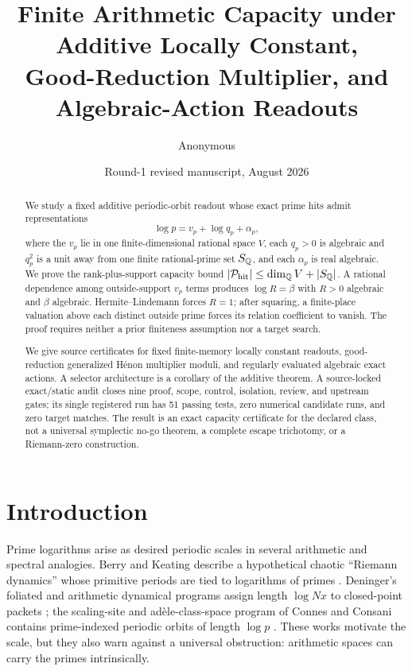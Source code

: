 \documentclass[11pt]{article}
\title{\textbf{Finite Arithmetic Capacity under Additive Locally Constant,\\
Good-Reduction Multiplier, and Algebraic-Action Readouts}}
\author{Anonymous}
\date{Round-1 revised manuscript, August 2026}
\theoremstyle{definition}
\theoremstyle{remark}
\begin{document}
\maketitle

\begin{abstract}
We study a fixed additive periodic-orbit readout whose exact prime hits admit
representations
\[
 \log p=v_p+\log q_p+\alpha_p,
\]
where the $v_p$ lie in one finite-dimensional rational space $V$, each
$q_p>0$ is algebraic and $q_p^2$ is a unit away from one finite rational-prime
set $S_{\mathbb Q}$, and each $\alpha_p$ is real algebraic.  We prove the rank-plus-support
capacity bound $|\mathcal P_{\mathrm{hit}}|\leq\dim_{\mathbb Q} V+|S_{\mathbb Q}|$.  A rational dependence among outside-support
$v_p$ terms produces $\log R=\beta$ with $R>0$ algebraic and $\beta$
algebraic.  Hermite--Lindemann forces $R=1$; after squaring, a finite-place
valuation above each distinct outside prime forces its relation coefficient
to vanish.  The proof requires neither a prior finiteness assumption nor a
target search.

We give source certificates for fixed finite-memory locally constant
readouts, good-reduction generalized H\'enon multiplier moduli, and regularly
evaluated algebraic exact actions.  A selector architecture is a corollary of
the additive theorem.  A source-locked exact/static audit closes nine
proof, scope, control, isolation, review, and upstream gates; its single
registered run has 51 passing tests, zero numerical candidate runs, and zero
target matches.  The result is an exact capacity certificate for the declared
class, not a universal symplectic no-go theorem, a complete escape trichotomy,
or a Riemann-zero construction.
\end{abstract}

\section{Introduction}
\label{sec:intro}

Prime logarithms arise as desired periodic scales in several arithmetic and
spectral analogies.  Berry and Keating describe a hypothetical chaotic
``Riemann dynamics'' whose primitive periods are tied to logarithms of primes
\citep{berry_keating_1999}.  Deninger's foliated and arithmetic dynamical
programs assign length $\log Nx$ to closed-point packets
\citep{deninger_1998,deninger_2026}; the scaling-site and ad\`ele-class-space
program of Connes and Consani contains prime-indexed periodic orbits of length
$\log p$ \citep{connes_consani_2016,connes_consani_2024}.  These works motivate
the scale, but they also warn against a universal obstruction: arithmetic
spaces can carry the primes intrinsically.
\end{document}
